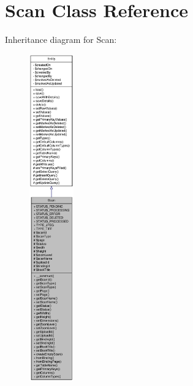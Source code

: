 \hypertarget{classScan}{
\section{Scan Class Reference}
\label{classScan}
}


Inheritance diagram for Scan:\nopagebreak
\begin{figure}[H]
\begin{center}
\leavevmode
\includegraphics[height=400pt]{classScan__inherit__graph}
\end{center}
\end{figure}


